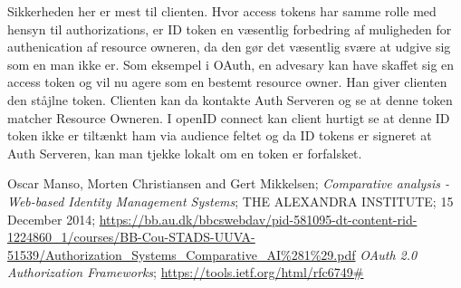 \documentclass[a4paper,12pt]{article}
\theoremstyle{plain}
\theoremstyle{nonumberplain}
\begin{document}
Sikkerheden her er mest til clienten. Hvor access tokens har samme rolle med hensyn til authorizations, er ID token en væsentlig forbedring af muligheden for authenication af resource owneren, da den gør det væsentlig svære at udgive sig som en man ikke er. Som eksempel i OAuth, en advesary kan have skaffet sig en access token og vil nu agere som en bestemt resource owner. Han giver clienten den ståjlne token. Clienten kan da kontakte Auth Serveren og se at denne token matcher Resource Owneren. I openID connect kan client hurtigt se at denne ID token ikke er tiltænkt ham via audience feltet og da ID tokens er signeret at Auth Serveren, kan man tjekke lokalt om en token er forfalsket.


\begin{thebibliography}{9}

    Oscar Manso, Morten Christiansen and Gert Mikkelsen;
    \emph{Comparative analysis - Web-based Identity Management Systems};
    THE ALEXANDRA INSTITUTE;
    15 December 2014;
    \url{https://bb.au.dk/bbcswebdav/pid-581095-dt-content-rid-1224860_1/courses/BB-Cou-STADS-UUVA-51539/Authorization_Systems_Comparative_AI%281%29.pdf}
    \emph{OAuth 2.0 Authorization Frameworks};
    \url{https://tools.ietf.org/html/rfc6749#}
\end{thebibliography}
\end{document}
